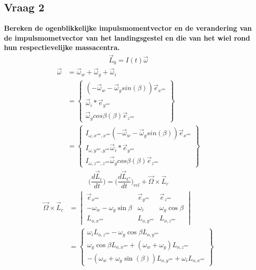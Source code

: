 \documentclass[a4paper,10pt]{article}
\begin{document}
\subsection{Vraag 2}
\textbf{Bereken de ogenblikkelijke impulsmomentvector en de verandering van de impulsmometvector van het landingsgestel en die van het wiel rond hun respectievelijke massacentra.}
\begin{equation}
\begin{aligned}
	\vec{L}_0 = I(t)\vec{\omega}
\end{aligned}
\end{equation}
\begin{equation}
\begin{aligned}
\vec{\omega} &= \vec{\omega}_w + \vec{\omega}_g + \vec{\omega}_i\\
&= \begin{Bmatrix}
(-\vec{\omega}_w -\vec{\omega}_g sin(\beta))\vec{e}_{x''''}\\
\vec{\omega}_i*\vec{e}_{y''''}\\
\vec{\omega}_g cos{\beta}(\beta)\vec{e}_{z''''}
\end{Bmatrix}\\
&=\begin{Bmatrix}
I_{\omega,x'''',x''''} (-\vec{\omega}_w -\vec{\omega}_g sin(\beta))\vec{e}_{x''''}\\
I_{\omega,y'''',y''''}\vec{\omega}_i*\vec{e}_{y''''}\\
I_{\omega,z'''',z''''}\vec{\omega}_g cos{\beta}(\beta)\vec{e}_{z''''}
\end{Bmatrix}
\end{aligned}
\end{equation}
\begin{equation}
\begin{aligned}
\Big(\dfrac{d\vec{L}_c}{dt}\Big) = \Big(\dfrac{d\vec{L}_C}{dt}\Big)_{rel} + \vec{\Omega} \times \vec{L}_c
\end{aligned}
\end{equation}
\begin{equation}
\begin{aligned}
\vec{\Omega} \times \vec{L}_c &= \begin{vmatrix}
\vec{e}_{x''''} & \vec{e}_{y''''} & \vec{e}_{z''''}\\
-\omega_w -\omega_g  \sin{\beta} & \omega_i & \omega_g\cos{\beta} \\
L_{o,x''''} & L_{o,y''''}  & L_{o,z''''} 
\end{vmatrix}\\
&=\begin{Bmatrix}
\omega_i L_{o,z''''}-\omega_g \cos{\beta} L_{o,y''''}\\
\omega_g \cos{\beta} L_{o,x''''} + (\omega_w + \omega_g ) L_{o,z''''}\\
-(\omega_w + \omega_g \sin(\beta ))L_{o,y''''} + \omega_i L_{o,x''''}
\end{Bmatrix}
\end{aligned}
\end{equation}
\end{document}
